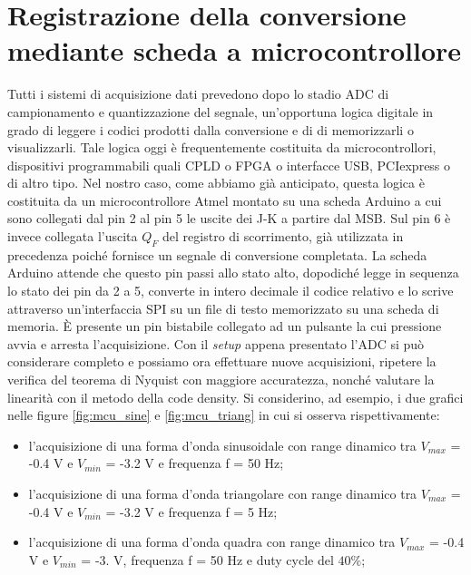 \documentclass[journal]{IEEEtran}
\begin{document}
\section{Registrazione della conversione mediante scheda a microcontrollore}
Tutti i sistemi di acquisizione dati prevedono dopo lo stadio ADC di campionamento e quantizzazione del segnale, un'opportuna logica digitale in grado di leggere i codici prodotti dalla conversione e di di memorizzarli o visualizzarli. Tale logica oggi è frequentemente costituita da microcontrollori, dispositivi programmabili quali CPLD o FPGA o interfacce USB, PCIexpress o di altro tipo. Nel nostro caso, come abbiamo già anticipato, questa logica è costituita da un microcontrollore Atmel montato su una scheda Arduino a cui sono collegati dal pin 2 al pin 5 le uscite dei J-K a partire dal MSB. Sul pin 6 è invece collegata l'uscita $Q_F$ del registro di scorrimento, già utilizzata in precedenza poiché fornisce un segnale di conversione completata. La scheda Arduino attende che questo pin passi allo stato alto, dopodiché legge in sequenza lo stato dei pin da 2 a 5, converte in intero decimale il codice relativo e lo scrive attraverso un'interfaccia SPI su un file di testo memorizzato su una scheda di memoria. È presente un pin bistabile collegato ad un pulsante la cui pressione avvia e arresta l'acquisizione. Con il \textit{setup} appena presentato l'ADC si può considerare completo e possiamo ora effettuare nuove acquisizioni, ripetere la verifica del teorema di Nyquist con maggiore accuratezza, nonché valutare la linearità con il metodo della code density. Si considerino, ad esempio, i due grafici nelle figure \ref{fig:mcu_sine} e \ref{fig:mcu_triang} in cui si osserva rispettivamente:
\begin{itemize}
    \item l'acquisizione di una forma d'onda sinusoidale con range dinamico tra $V_{max}$ = -0.4 V e $V_{min}$ = -3.2 V e frequenza f = 50 Hz;
    \item l'acquisizione di una forma d'onda triangolare con range dinamico tra $V_{max}$ = -0.4 V e $V_{min}$ = -3.2 V e frequenza f = 5 Hz;
    \item l'acquisizione di una forma d'onda quadra con range dinamico tra $V_{max}$ = -0.4 V e $V_{min}$ = -3. V, frequenza f = 50 Hz e duty cycle del $40 \%$;
\end{itemize}
\end{document}
